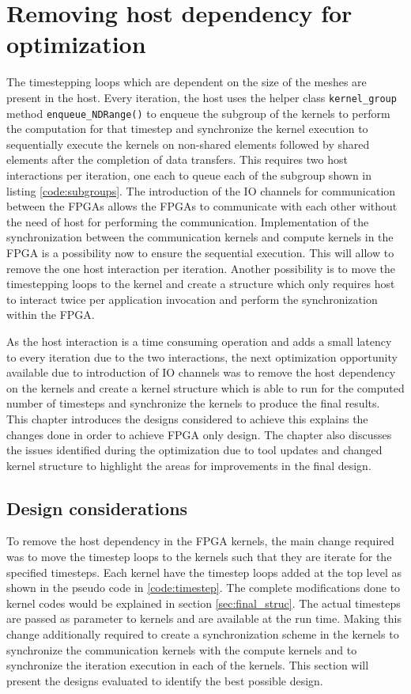 \chapter{Removing host dependency for optimization}
\label{cha:sys_fpgaonly}

The timestepping loops which are dependent on the size of the meshes are present in the host.
Every iteration, the host uses the helper class \texttt{kernel\_group} method
\texttt{enqueue\_NDRange()} to enqueue the subgroup of the kernels to perform the
computation for that timestep and synchronize the kernel execution to sequentially
execute the kernels on non-shared elements followed by shared elements after the completion
of data transfers. This requires two host interactions per iteration, one each to queue
each of the subgroup shown in listing \ref{code:subgroups}. The introduction of the IO channels
for communication between the FPGAs allows the FPGAs to communicate with each other without the need of host
for performing the communication. Implementation of the synchronization between the communication
kernels and compute kernels in the FPGA is a possibility now to ensure the sequential execution. This will
allow to remove the one host interaction per iteration. Another possibility is to move
the timestepping loops to the kernel and create a structure which only requires host to interact twice
per application invocation and perform the synchronization within the FPGA.

As the host interaction is a time consuming operation and adds a small latency to every iteration
due to the two interactions, the next optimization opportunity available due to introduction
of IO channels was to remove the host dependency on the kernels and create a kernel structure which
is able to run for the computed number of timesteps and synchronize the kernels to produce the final
results. This chapter introduces the designs considered to achieve this explains the changes done
in order to achieve FPGA only design. The chapter also discusses the issues identified during the
optimization due to tool updates and changed kernel structure to highlight the areas for improvements
in the final design.

\section{Design considerations}

To remove the host dependency in the FPGA kernels, the main change
required was to move the timestep loops to the kernels such that
they are iterate for the specified timesteps. Each kernel have the timestep loops
added at the top level as shown in the pseudo code in \ref{code:timestep}.
The complete modifications done to kernel codes would be explained in section \ref{sec:final_struc}.
The actual timesteps are passed as parameter to kernels and
are available at the run time. Making this change
additionally required to create a synchronization scheme in the kernels
to synchronize the communication kernels with the compute kernels
and to synchronize the iteration execution in each of the kernels.
This section will present the designs evaluated to identify the
best possible design.

